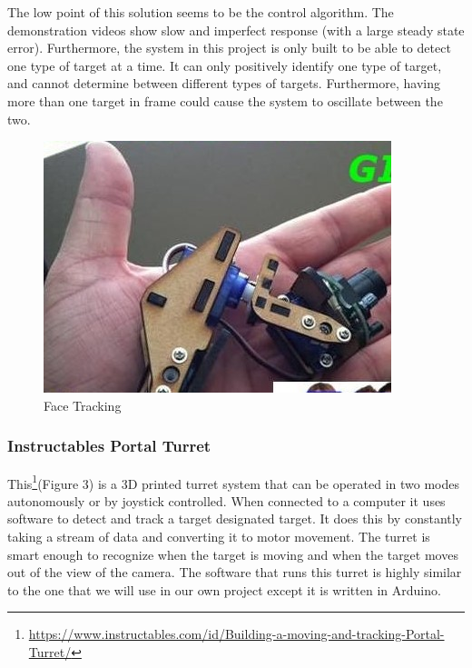 The low point of this solution seems to be the control algorithm. The demonstration videos show slow and imperfect response (with a large steady state error). Furthermore, the system in this project is only built to be able to detect one type of target at a time. It can only positively identify one type of target, and cannot determine between different types of targets. Furthermore, having more than one target in frame could cause the system to oscillate between the two.
\begin{figure}[h!]
    \centering
    \includegraphics[scale=.4]{facepalmtracking.jpg}
    \caption{Face Tracking}
    \label{fig:face palm}
\end{figure}


\subsubsection{Instructables Portal Turret}
This\footnote{\url{https://www.instructables.com/id/Building-a-moving-and-tracking-Portal-Turret/}}(Figure 3) is a 3D printed turret system that can be operated in two modes autonomously or by joystick controlled. When connected to a computer it uses software to detect and track a target designated target. It does this by constantly taking a stream of data and converting it to motor movement. The turret is smart enough to recognize when the target is moving and when the target moves out of the view of the camera.  The software that runs this turret is highly similar to the one that we will use in our own project except it is written in Arduino. 

